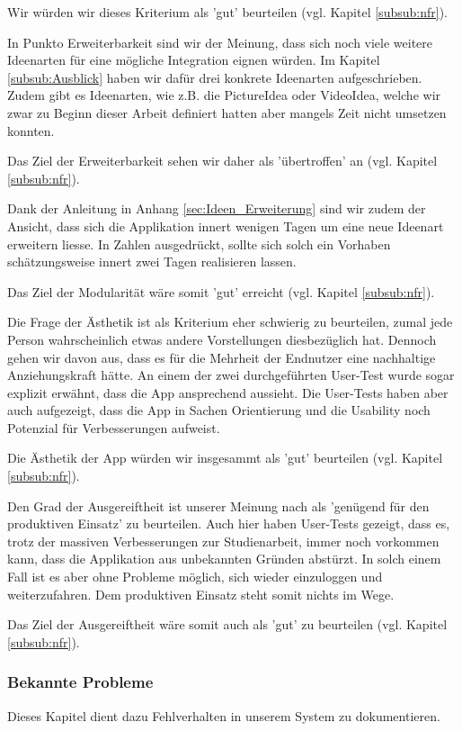 Wir würden wir dieses Kriterium als 'gut' beurteilen (vgl. Kapitel \ref{subsub:nfr}).
 
 In Punkto Erweiterbarkeit sind wir der Meinung, dass sich  noch viele weitere Ideenarten für eine mögliche Integration eignen würden. Im Kapitel \ref{subsub:Ausblick} haben wir dafür drei konkrete Ideenarten aufgeschrieben. Zudem gibt es Ideenarten, wie z.B. die PictureIdea oder VideoIdea, welche wir zwar zu Beginn dieser Arbeit definiert hatten aber mangels Zeit nicht umsetzen konnten. 
 
Das Ziel der Erweiterbarkeit sehen wir daher als 'übertroffen' an (vgl. Kapitel \ref{subsub:nfr}).

Dank der Anleitung in Anhang \ref{sec:Ideen_Erweiterung} sind wir zudem der Ansicht, dass sich die Applikation innert wenigen Tagen um eine neue Ideenart erweitern liesse. In Zahlen ausgedrückt, sollte sich solch ein Vorhaben schätzungsweise innert zwei Tagen realisieren lassen. 

Das Ziel der Modularität wäre somit 'gut' erreicht (vgl. Kapitel \ref{subsub:nfr}).

Die Frage der Ästhetik ist als Kriterium eher schwierig zu beurteilen, zumal jede Person wahrscheinlich etwas andere Vorstellungen diesbezüglich hat. Dennoch gehen wir davon aus, dass es für die Mehrheit der Endnutzer eine nachhaltige Anziehungskraft hätte. An einem der zwei durchgeführten User-Test wurde sogar explizit erwähnt, dass die App ansprechend aussieht. Die User-Tests haben aber auch aufgezeigt, dass die App in Sachen Orientierung und die Usability noch Potenzial für Verbesserungen aufweist.

Die Ästhetik der App würden wir insgesammt als 'gut' beurteilen (vgl. Kapitel \ref{subsub:nfr}).

Den Grad der Ausgereiftheit ist unserer Meinung nach als 'genügend für den produktiven Einsatz' zu beurteilen. Auch hier haben User-Tests gezeigt, dass es, trotz der massiven Verbesserungen zur Studienarbeit, immer noch vorkommen kann, dass die Applikation aus unbekannten Gründen abstürzt. In solch einem Fall ist es aber ohne Probleme möglich, sich wieder einzuloggen und weiterzufahren. Dem produktiven Einsatz steht somit nichts im Wege.

Das Ziel der Ausgereiftheit wäre somit auch als 'gut' zu beurteilen (vgl. Kapitel \ref{subsub:nfr}). 

\subsubsection{Bekannte Probleme}
Dieses Kapitel dient dazu Fehlverhalten in unserem System zu dokumentieren.

